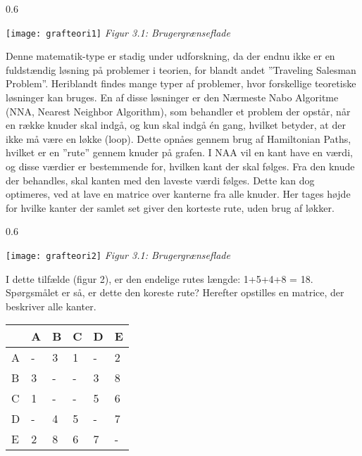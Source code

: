 \begin{wrapfigure}{}{0.6\textwidth}
  \vspace{-45pt}
  \begin{center}
    \texttt{[image: grafteori1]} \newline
    \textit{Figur 3.1: Brugergrænseflade}\newline
  \end{center}
  \vspace{-20pt}
\end{wrapfigure}

Denne matematik-type er stadig under udforskning, da der endnu ikke er en fuldstændig løsning på problemer i teorien, for blandt andet ”Traveling Salesman Problem”. Heriblandt findes mange typer af problemer, hvor forskellige teoretiske løsninger kan bruges. En af disse løsninger er den Nærmeste Nabo Algoritme (NNA, Nearest Neighbor Algorithm), som behandler et problem der opstår, når en række knuder skal indgå, og kun skal indgå én gang, hvilket betyder, at der ikke må være en løkke (loop). Dette opnåes gennem brug af Hamiltonian Paths, hvilket er en ”rute” gennem knuder på grafen. I NAA vil en kant have en værdi, og disse værdier er bestemmende for, hvilken kant der skal følges. Fra den knude der behandles, skal kanten med den laveste værdi følges. Dette kan dog optimeres, ved at lave en matrice over kanterne fra alle knuder. Her tages højde for hvilke kanter der samlet set giver den korteste rute, uden brug af løkker.

 
\begin{wrapfigure}{}{0.6\textwidth}
  \vspace{-45pt}
  \begin{center}
    \texttt{[image: grafteori2]} \newline
    \textit{Figur 3.1: Brugergrænseflade}\newline
  \end{center}
  \vspace{-20pt}
\end{wrapfigure}

I dette tilfælde (figur 2), er den endelige rutes længde: 1+5+4+8 = 18. Spørgsmålet er så, er dette den koreste rute? Herefter opstilles en matrice, der beskriver alle kanter.

\begin{tabular}{| l | l | l | l | l | l |}
	\hline
	  & A & B & C & D & E \\ \hline
	A & - & 3 & 1 & - & 2 \\ \hline
	B & 3 & - & - & 3 & 8 \\ \hline
	C & 1 & - & - & 5 & 6 \\ \hline
	D & - & 4 & 5 & - & 7 \\ \hline
	E & 2 & 8 & 6 & 7 & - \\
	\hline
	\end{tabular}


